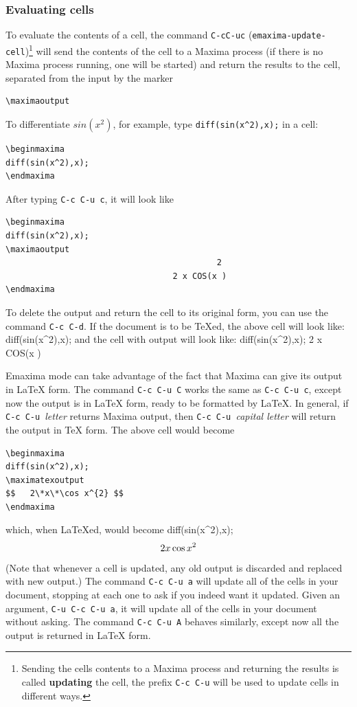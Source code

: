 \subsubsection{Evaluating cells}

\noindent
To evaluate the contents of a cell, the command
\texttt{C-cC-uc} (\texttt{emaxima-update-cell})\footnote{Sending the
  cells contents to a Maxima process and returning the results is
  called \textbf{updating} the cell, the prefix 
\texttt{C-c C-u} will be used to update cells in different ways.} 
will send the contents
of the cell to a Maxima process (if there is no Maxima process running,
one will be started) and return the results to the cell,
separated from the input by the marker
\begin{verbatim}
\maximaoutput
\end{verbatim}
\noindent
To differentiate
$sin(x^2)$, for example, type 
\texttt{diff(sin(x\^{}2),x);} in a cell:
\begin{verbatim}
\beginmaxima
diff(sin(x^2),x);
\endmaxima
\end{verbatim}
\noindent
After typing \texttt{C-c C-u c}, it will look like
\begin{verbatim}
\beginmaxima
diff(sin(x^2),x);
\maximaoutput
                                           2
                                  2 x COS(x )
\endmaxima
\end{verbatim}
\noindent
To delete the output and return the cell to its original form, you can
use the command \texttt{C-c C-d}.
If the document is to be \TeX{}ed, the above cell will look like:
\beginmaxima
diff(sin(x^2),x);
\endmaxima
and the cell with output will look like:
\beginmaxima
diff(sin(x^2),x);
                                  2 x COS(x )
\endmaxima

Emaxima mode can take advantage of the fact that Maxima can give its
output in \LaTeX{} form.  The command \texttt{C-c C-u C}
works the same as \texttt{C-c C-u c}, except now the output is in \LaTeX{}
form, ready to be formatted by \LaTeX{}.  In general, if 
\texttt{C-c C-u }\textsl{letter} returns Maxima output, then
\texttt{C-c C-u }\textsl{capital letter} will return the output in
\TeX{} form.  The above cell would become
\begin{verbatim}
\beginmaxima
diff(sin(x^2),x);
\maximatexoutput
$$   2\*x\*\cos x^{2} $$
\endmaxima
\end{verbatim}
\noindent
which, when \LaTeX{}ed, would become
\beginmaxima
diff(sin(x^2),x);
\maximatexoutput
$$   2\*x\*\cos x^{2} $$
\endmaxima
\noindent
(Note that whenever a cell is updated, any old output is discarded and
replaced with new output.)  The command \texttt{C-c C-u a} will update all
of the cells in your document, 
stopping at each one to ask if you indeed want it updated.  Given an
argument, \texttt{C-u C-c C-u a}, it will update all of the cells in your
document without asking.  The command \texttt{C-c C-u A} behaves
similarly, except now all the output is returned in \LaTeX{}  form.

